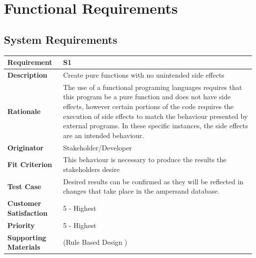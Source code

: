 \documentclass[12pt]{report}
\begin{document}
\section{Functional Requirements}\label{sec:Functional}

\subsection{System Requirements}
{\setlength{\tabcolsep}{12pt} %
    \begin{tabularx}{\textwidth}{>{\bfseries}m{3cm}X}
        Requirement & S1 \\ 
        \midrule
        \endhead
        Description  & Create pure functions with no unintended side effects
        \\	Rationale & The use of a functional programing languages requires 
        that this program be a pure function and does not have side effects, 
        however certain portions of the code requires the execution of side 
        effects to match the behaviour presented by external programs. In these 
        specific instances, the side effects are an intended behaviour.
        \\	Originator & Stakeholder/Developer
        
        \\	Fit Criterion & This behaviour is necessary to produce the results 
        the stakeholders desire
        \\ Test Case & Desired results can be confirmed as they will be 
        reflected in changes that take place in the ampersand database.
        \\	Customer Satisfaction & 5 - Highest 
        \\	Priority & 5 - Highest 
        \\	Supporting Materials & (Rule Based Design \cite {RBD})
        \vspace{12pt}
    \end{tabularx}
}
\end{document}
